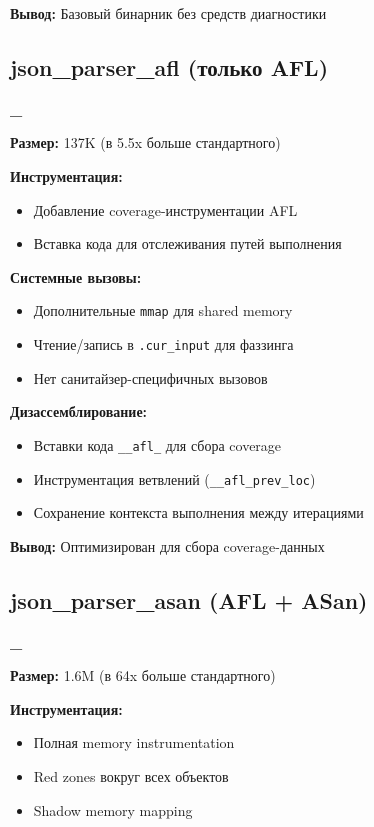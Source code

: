     \textbf{Вывод:} Базовый бинарник без средств диагностики

    \subsection{json\_parser\_afl (только AFL)}
    \textbf{\_}


    \textbf{Размер:} 137K (в 5.5x больше стандартного)

    \textbf{Инструментация:}
    \begin{itemize}
        \item Добавление coverage-инструментации AFL
        \item Вставка кода для отслеживания путей выполнения
    \end{itemize}

    \textbf{Системные вызовы:}
    \begin{itemize}
        \item Дополнительные \texttt{mmap} для shared memory
        \item Чтение/запись в \texttt{.cur\_input} для фаззинга
        \item Нет санитайзер-специфичных вызовов
    \end{itemize}

    \textbf{Дизассемблирование:}
    \begin{itemize}
        \item Вставки кода \texttt{\_\_afl\_} для сбора coverage
        \item Инструментация ветвлений (\texttt{\_\_afl\_prev\_loc})
        \item Сохранение контекста выполнения между итерациями
    \end{itemize}

    \textbf{Вывод:} Оптимизирован для сбора coverage-данных

    \subsection{json\_parser\_asan (AFL + ASan)}
    \textbf{\_}

    \textbf{Размер:} 1.6M (в 64x больше стандартного)

    \textbf{Инструментация:}
    \begin{itemize}
        \item Полная memory instrumentation
        \item Red zones вокруг всех объектов
        \item Shadow memory mapping
    \end{itemize}

